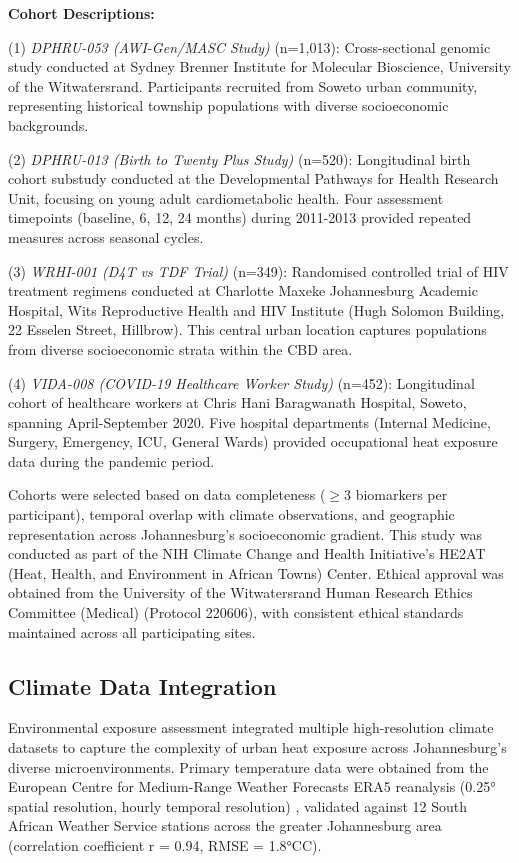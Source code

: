 \documentclass[11pt,a4paper]{article}
\newcommand{\degrees}{°C}
\begin{document}
\textbf{Cohort Descriptions:}

(1) \textit{DPHRU-053 (AWI-Gen/MASC Study)} (n=1,013): Cross-sectional genomic study conducted at Sydney Brenner Institute for Molecular Bioscience, University of the Witwatersrand. Participants recruited from Soweto urban community, representing historical township populations with diverse socioeconomic backgrounds.

(2) \textit{DPHRU-013 (Birth to Twenty Plus Study)} (n=520): Longitudinal birth cohort substudy conducted at the Developmental Pathways for Health Research Unit, focusing on young adult cardiometabolic health. Four assessment timepoints (baseline, 6, 12, 24 months) during 2011-2013 provided repeated measures across seasonal cycles.

(3) \textit{WRHI-001 (D4T vs TDF Trial)} (n=349): Randomised controlled trial of HIV treatment regimens conducted at Charlotte Maxeke Johannesburg Academic Hospital, Wits Reproductive Health and HIV Institute (Hugh Solomon Building, 22 Esselen Street, Hillbrow). This central urban location captures populations from diverse socioeconomic strata within the CBD area.

(4) \textit{VIDA-008 (COVID-19 Healthcare Worker Study)} (n=452): Longitudinal cohort of healthcare workers at Chris Hani Baragwanath Hospital, Soweto, spanning April-September 2020. Five hospital departments (Internal Medicine, Surgery, Emergency, ICU, General Wards) provided occupational heat exposure data during the pandemic period.

Cohorts were selected based on data completeness ($\geq$3 biomarkers per participant), temporal overlap with climate observations, and geographic representation across Johannesburg's socioeconomic gradient. This study was conducted as part of the NIH Climate Change and Health Initiative's HE2AT (Heat, Health, and Environment in African Towns) Center. Ethical approval was obtained from the University of the Witwatersrand Human Research Ethics Committee (Medical) (Protocol 220606), with consistent ethical standards maintained across all participating sites.

\subsection{Climate Data Integration}

Environmental exposure assessment integrated multiple high-resolution climate datasets to capture the complexity of urban heat exposure across Johannesburg's diverse microenvironments. Primary temperature data were obtained from the European Centre for Medium-Range Weather Forecasts ERA5 reanalysis (0.25° spatial resolution, hourly temporal resolution) \citep{Hersbach2020}, validated against 12 South African Weather Service stations across the greater Johannesburg area (correlation coefficient r = 0.94, RMSE = 1.8\degrees C).
\end{document}
